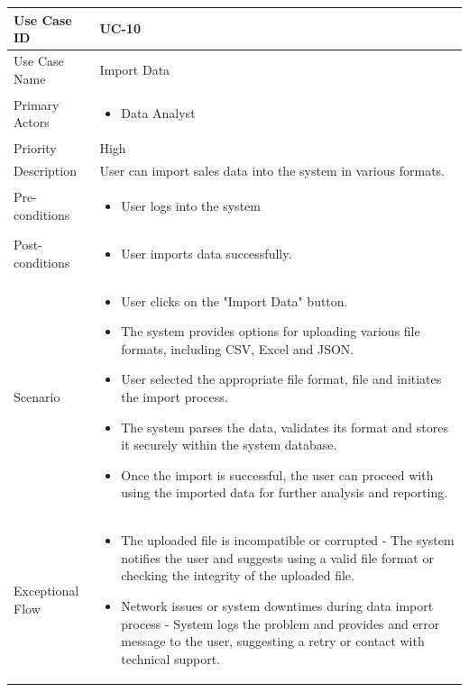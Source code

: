 \vspace{12pt}

\begin{tabularx}{\textwidth}{|l|X|}
\hline
Use Case ID & UC-10 \\
\hline
Use Case Name & Import Data\\
\hline
Primary Actors & 
\begin{itemize}
    \item Data Analyst
\end{itemize} \\
\hline
Priority & High \\
\hline
Description & User can import sales data into the system in various formats. \\
\hline
Pre-conditions & 
\begin{itemize}
    \item User logs into the system
\end{itemize} \\
\hline
Post-conditions & 
\begin{itemize}
    \item User imports data successfully.
\end{itemize} \\
\hline
Scenario & 
\begin{itemize}
    \item User clicks on the "Import Data" button. 
    \item The system provides options for uploading various file formats, including CSV, Excel and JSON.
    \item User selected the appropriate file format, file and initiates the import process.
    \item The system parses the data, validates its format and stores it securely within the system database.
    \item Once the import is successful, the user can proceed with using the imported data for further analysis and reporting.
\end{itemize}\\
\hline
Exceptional Flow & 
\begin{itemize}
    \item The uploaded file is incompatible or corrupted - The system notifies the user and suggests using a valid file format or checking the integrity of the uploaded file.
    \item Network issues or system downtimes during data import process - System logs the problem and provides and error message to the user, suggesting a retry or contact with technical support.
\end{itemize}\\
\hline
\end{tabularx}


